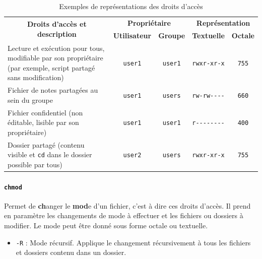 \begin{table}[h!]
    \begin{tabularx}{\textwidth}{|X|c|c|c|c|}
    \hline
\multicolumn{1}{|c|}{\multirow{2}{*}{\textbf{Droits d'accès et description}}}                                     & \multicolumn{2}{|c|}{\textbf{Propriétaire}} & \multicolumn{2}{|c|}{\textbf{Représentation}} \\
                                                                                                                & \textbf{Utilisateur} & \textbf{Groupe}    & \textbf{Textuelle} & \textbf{Octale}        \\ \hline
Lecture et exécution pour tous, modifiable par son propriétaire (par exemple, script partagé sans modification) & \texttt{user1}       & \texttt{user1}     & \texttt{rwxr-xr-x} & \texttt{755}           \\ \hline
Fichier de notes partagées au sein du groupe                                                                    & \texttt{user1}       & \texttt{users}     & \texttt{rw-rw-{}-{}-{}-} & \texttt{660}           \\ \hline
Fichier confidentiel (non éditable, lisible par son propriétaire)                                               & \texttt{user1}       & \texttt{user1}     & \texttt{r-{}-{}-{}-{}-{}-{}-{}-} & \texttt{400}           \\ \hline
Dossier partagé (contenu visible et \texttt{cd} dans le dossier possible par tous)                              & \texttt{user2}       & \texttt{users}     & \texttt{rwxr-xr-x} & \texttt{755}           \\ \hline            
\end{tabularx}
    \centering
    \caption{Exemples de représentations des droits d'accès}
    \label{fig:chmod_example}
\end{table}

\paragraph{\texttt{chmod}} 
Permet de \textbf{ch}anger le \textbf{mod}e d'un fichier, c'est à dire ces droits d'accès. Il prend en paramètre les changements de mode à effectuer et les fichiers ou dossiers à modifier. Le mode peut être donné sous forme octale ou textuelle.
\begin{itemize}
    \item \texttt{-R} : Mode récursif. Applique le changement récursivement à tous les fichiers et dossiers contenu dans un dossier.
\end{itemize}\vspace{\baselineskip}

